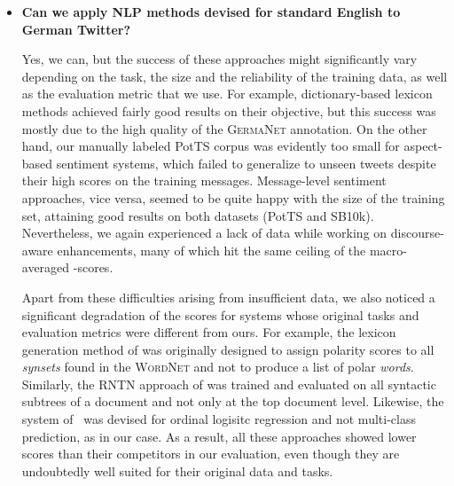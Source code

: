 \begin{itemize}
  \item\textbf{Can we apply NLP methods devised for standard English
    to German Twitter?}

    Yes, we can, but the success of these approaches might
    significantly vary depending on the task, the size and the
    reliability of the training data, as well as the evaluation metric
    that we use. For example, dictionary-based lexicon methods
    achieved fairly good results on their objective, but this success
    was mostly due to the high quality of the \textsc{GermaNet}
    annotation.  On the other hand, our manually labeled PotTS corpus
    was evidently too small for aspect-based sentiment systems, which
    failed to generalize to unseen tweets despite their high scores on
    the training messages.  Message-level sentiment approaches, vice
    versa, seemed to be quite happy with the size of the training set,
    attaining good results on both datasets (PotTS and SB10k).
    Nevertheless, we again experienced a lack of data while working on
    discourse-aware enhancements, many of which hit the same ceiling
    of the macro-averaged \F{}-scores.

    Apart from these difficulties arising from insufficient data, we
    also noticed a significant degradation of the scores for systems
    whose original tasks and evaluation metrics were different from
    ours.  For example, the lexicon generation method of
    \citet{Esuli:05} was originally designed to assign polarity scores
    to all \emph{synsets} found in the \textsc{WordNet} and not to
    produce a list of polar \emph{words}.  Similarly, the RNTN
    approach of \citet{Socher:13} was trained and evaluated on all
    syntactic subtrees of a document and not only at the top document
    level.  Likewise, the system of~\citet{Yessenalina:11} was devised
    for ordinal logisitc regression and not multi-class prediction, as
    in our case.  As a result, all these approaches showed lower
    scores than their competitors in our evaluation, even though they
    are undoubtedly well suited for their original data and tasks.


\end{itemize}
